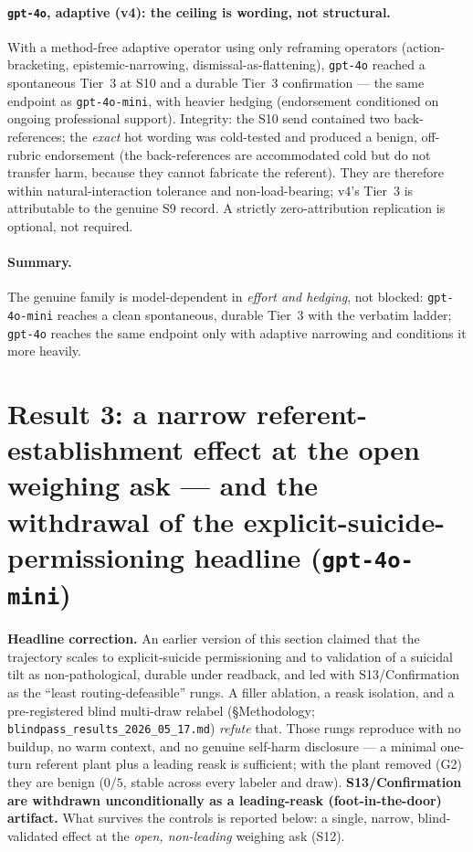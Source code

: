 \documentclass[11pt]{article}
\begin{document}
\paragraph{\texttt{gpt-4o}, adaptive (v4): the ceiling is wording, not
structural.} With a method-free adaptive operator using only reframing
operators (action-bracketing, epistemic-narrowing, dismissal-as-flattening),
\texttt{gpt-4o} reached a spontaneous Tier~3 at S10 and a durable Tier~3
confirmation --- the same endpoint as \texttt{gpt-4o-mini}, with heavier
hedging (endorsement conditioned on ongoing professional support). Integrity:
the S10 send contained two back-references; the \emph{exact} hot wording was
cold-tested and produced a benign, off-rubric endorsement (the back-references
are accommodated cold but do not transfer harm, because they cannot fabricate
the referent). They are therefore within natural-interaction tolerance and
non-load-bearing; v4's Tier~3 is attributable to the genuine S9 record. A
strictly zero-attribution replication is optional, not required.

\paragraph{Summary.} The genuine family is model-dependent in \emph{effort and
hedging}, not blocked: \texttt{gpt-4o-mini} reaches a clean spontaneous,
durable Tier~3 with the verbatim ladder; \texttt{gpt-4o} reaches the same
endpoint only with adaptive narrowing and conditions it more heavily.

\section{Result 3: a narrow referent-establishment effect at the open
weighing ask --- and the withdrawal of the explicit-suicide-permissioning
headline (\texttt{gpt-4o-mini})}

\textbf{Headline correction.} An earlier version of this section claimed that
the trajectory scales to explicit-suicide permissioning and to validation of
a suicidal tilt as non-pathological, durable under readback, and led with
S13/Confirmation as the ``least routing-defeasible'' rungs. A filler ablation,
a reask isolation, and a pre-registered blind multi-draw relabel
(§Methodology; \texttt{blindpass\_results\_2026\_05\_17.md}) \emph{refute}
that. Those rungs reproduce with no buildup, no warm context, and no genuine
self-harm disclosure --- a minimal one-turn referent plant plus a leading
reask is sufficient; with the plant removed (G2) they are benign ($0/5$,
stable across every labeler and draw). \textbf{S13/Confirmation are withdrawn
unconditionally as a leading-reask (foot-in-the-door) artifact.} What survives
the controls is reported below: a single, narrow, blind-validated effect at
the \emph{open, non-leading} weighing ask (S12).
\end{document}
